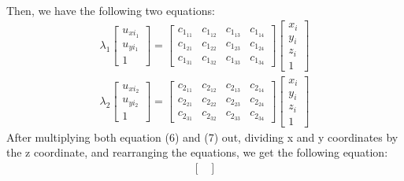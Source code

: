 \begin{your_solution}[title=Q3.2,height=22.5cm,width=\linewidth]
\begin{align}
\end{align}
Then, we have the following two equations:
\begin{align}
	 \lambda_1\begin{bmatrix} u_{xi_{1}} \\ u_{yi_{1}} \\ 1 \end{bmatrix} = \begin{bmatrix}
		c_{1_{11}} & c_{1_{12}} & c_{1_{13}} & c_{1_{14}} \\
		c_{1_{21}} & c_{1_{22}} & c_{1_{23}} & c_{1_{24}} \\
		c_{1_{31}} & c_{1_{32}} & c_{1_{33}} & c_{1_{34}}
	\end{bmatrix} \begin{bmatrix} x_i \\ y_i \\ z_i \\ 1 \end{bmatrix} \\
	 \lambda_2\begin{bmatrix} u_{xi_{2}} \\ u_{yi_{2}} \\ 1 \end{bmatrix} = \begin{bmatrix}
		c_{2_{11}} & c_{2_{12}} & c_{2_{13}} & c_{2_{14}} \\
		c_{2_{21}} & c_{2_{22}} & c_{2_{23}} & c_{2_{24}} \\
		c_{2_{31}} & c_{2_{32}} & c_{2_{33}} & c_{2_{34}}
	\end{bmatrix} \begin{bmatrix} x_i \\ y_i \\ z_i \\ 1 \end{bmatrix}
\end{align}
After multiplying both equation (6) and (7) out, dividing x and y coordinates by the z coordinate, and rearranging the equations, we get the following equation:
\begin{align}
	\begin{bmatrix}

\end{bmatrix}
\end{align}
\end{your_solution}
